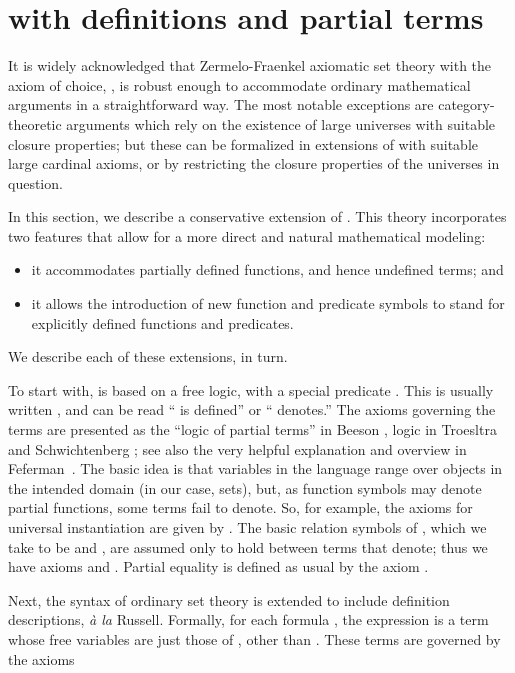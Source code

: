 \documentclass{llncs}
\begin{document}
\section{ with definitions and partial terms}
\label{dzfc:section}

It is widely acknowledged that Zermelo-Fraenkel axiomatic set theory
with the axiom of choice, , is robust enough to accommodate
ordinary mathematical arguments in a straightforward way. The most
notable exceptions are category-theoretic arguments which rely on the
existence of large universes with suitable closure properties; but
these can be formalized in extensions of  with suitable
large cardinal axioms, or by restricting the closure properties of the
universes in question. 

In this section, we describe a conservative extension  of
. This theory incorporates two features that allow for a
more direct and natural mathematical modeling:
\begin{itemize}
\item it accommodates partially defined functions, and hence
  undefined terms; and
\item it allows the introduction of new function and predicate
  symbols to stand for explicitly defined functions and predicates.
\end{itemize}
We describe each of these extensions, in turn. 

To start with,  is based on a free logic, with a special
predicate . This is usually written , and can be
read `` is defined'' or `` denotes.'' The axioms governing the
terms are presented as the ``logic of partial terms'' in Beeson
\cite{beeson:85},  logic in Troesltra and Schwichtenberg
\cite{troelstra:schwichtenberg:00}; see also the very helpful
explanation and overview in Feferman~\cite{feferman:95}. The basic idea
is that variables in the language range over objects in the intended
domain (in our case, sets), but, as function symbols may denote
partial functions, some terms fail to denote. So, for example, the
axioms for universal instantiation are given by . The basic relation symbols of
, which we take to be  and , are assumed only to
hold between terms that denote; thus we have axioms  and . Partial equality  is defined as usual
by the axiom . 

Next, the syntax of ordinary set theory is extended to include
definition descriptions, \emph{\`a la} Russell. Formally, for each
formula , the expression  is a term whose
free variables are just those of , other than . These terms
are governed by the axioms
\end{document}
